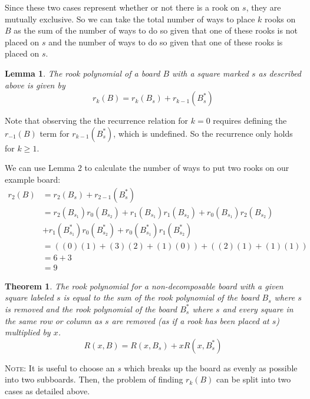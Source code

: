 \documentclass{article}
\newtheorem{lemma}{Lemma}
\newtheorem{theorem}{Theorem}
\begin{document}
Since these two cases represent whether or not there is a rook on $s$, they are mutually exclusive. So we can take the total number of ways to place $k$ rooks on $B$ as the sum of the number of ways to do so given that one of these rooks is not placed on $s$ and the number of ways to do so given that one of these rooks is placed on $s$. 
\begin{lemma} \label{recurrence}
    The rook polynomial of a board $B$ with a square marked $s$ as described above is given by
    \begin{equation} \label{ndcp}
        r_k(B) = r_k(B_s) + r_{k-1}(B_{s}^*)
    \end{equation}
\end{lemma}


Note that observing the the recurrence relation for $k = 0$ requires defining the $r_{-1}(B)$ term for $r_{k-1}(B_{s}^*)$, which is undefined. So the recurrence only holds for $k \geq 1$.

We can use Lemma 2 to calculate the number of ways to put two rooks on our example board:
\begin{align*}
    r_2(B) &= r_2(B_s) + r_{2-1}(B_{s}^*) \\
    & = r_2(B_{s_1})r_0(B_{s_2}) + r_1(B_{s_1})r_1(B_{s_2}) + r_0(B_{s_1})r_2(B_{s_2}) \\ &+ r_1(B_{s_1}^*)r_0(B_{s_2}^*) + r_0(B_{s_1}^*)r_1(B_{s_2}^*) \\
    & = ((0)(1) + (3)(2) + (1)(0)) + ((2)(1) + (1)(1)) \\
    & = 6 + 3 \\
    & = 9
\end{align*}

\pagebreak
\begin{theorem} The rook polynomial for a non-decomposable board with a given square labeled $s$ is equal to the sum of the rook polynomial of the board $B_s$ where $s$ is removed and the rook polynomial of the board $B_s^*$ where $s$ and every square in the same row or column as $s$ are removed (as if a rook has been placed at $s$) multiplied by $x$.
    \begin{equation} \label{thm2}
        R(x, B) = R(x, B_s) + x R(x, B_{s}^*)
    \end{equation}
\end{theorem}
\textsc{Note:} It is useful to choose an $s$ which breaks up the board as evenly as possible into two subboards. Then, the problem of finding $r_k(B)$ can be split into two cases as detailed above.
\end{document}
